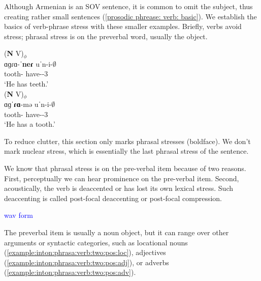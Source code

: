 Although Armenian is an SOV sentence, it is common to omit the subject, thus creating rather small sentences (\ref{prosodic phrease: verb: basic}). We establish the basics of verb-phrase stress with these smaller examples. Briefly, verbs avoid stress;   phrasal stress is on the preverbal word, usually the object. 


\begin{exe}
	\ex \label{prosodic phrease: verb: basic}
	\begin{xlist}
		\ex \glll (\textbf{N} V)$_\phi$ \\
		ɑɡɾɑ-ˈ\textbf{neɾ} uˈn-i-$\emptyset$\\ 
		tooth-{\pl} have-{\thgloss}-3{\sg} \\
		\trans `He has teeth.'  \label{prosodic phrease: verb: npl v}\\ 
		\ex \glll (\textbf{N} V)$_\phi$ \\
		ɑɡˈ\textbf{ɾɑ}-mə uˈn-i-$\emptyset$\\ 
		tooth-{\indf} have-{\thgloss}-3{\sg} \\
		\trans `He has a  tooth.' \\ 
		
\end{xlist}\end{exe}

To reduce clutter, this section only marks phrasal stresses (boldface). We don't mark nuclear stress, which is essentially the last phrasal stress of the sentence. 


We know that phrasal stress is on the pre-verbal item because of two reasons. First, perceptually we can hear prominence on the pre-verbal item. Second, acoustically, the verb is deaccented or has lost its own lexical stress. Such deaccenting is called post-focal deaccenting or post-focal compression. 

\textcolor{blue}{wav form}


The preverbal item is usually a noun object, but it can range over other arguments or syntactic categories, such as locational nouns (\ref{example:inton:phrasa:verb:two:pos:loc}), adjectives (\ref{example:inton:phrasa:verb:two:pos:adj}),  or adverbs (\ref{example:inton:phrasa:verb:two:pos:adv}). 


